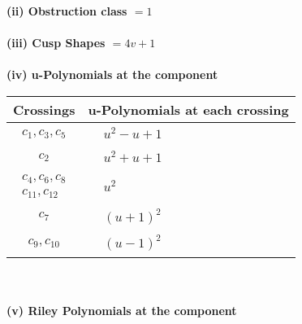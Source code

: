 \documentclass[1p]{elsarticle_modified}
\theoremstyle{definition}
\begin{document}
\flushleft \textbf{(ii) Obstruction class $= 1$}\\~\\
\flushleft \textbf{(iii) Cusp Shapes $= 4 v+1$}\\~\\
\newpage\renewcommand{\arraystretch}{1}
\flushleft \textbf{(iv) u-Polynomials at the component}\newline \\
\begin{tabular}{m{50pt}|m{274pt}}
Crossings & \hspace{64pt}u-Polynomials at each crossing \\
\hline $$\begin{aligned}c_{1},c_{3},c_{5}\end{aligned}$$&$\begin{aligned}
&u^2- u+1
\end{aligned}$\\
\hline $$\begin{aligned}c_{2}\end{aligned}$$&$\begin{aligned}
&u^2+u+1
\end{aligned}$\\
\hline $$\begin{aligned}c_{4},c_{6},c_{8}\\c_{11},c_{12}\end{aligned}$$&$\begin{aligned}
&u^2
\end{aligned}$\\
\hline $$\begin{aligned}c_{7}\end{aligned}$$&$\begin{aligned}
&(u+1)^2
\end{aligned}$\\
\hline $$\begin{aligned}c_{9},c_{10}\end{aligned}$$&$\begin{aligned}
&(u-1)^2
\end{aligned}$\\
\hline
\end{tabular}\\~\\
\newpage\renewcommand{\arraystretch}{1}
\flushleft \textbf{(v) Riley Polynomials at the component}\newline \\
\end{document}
